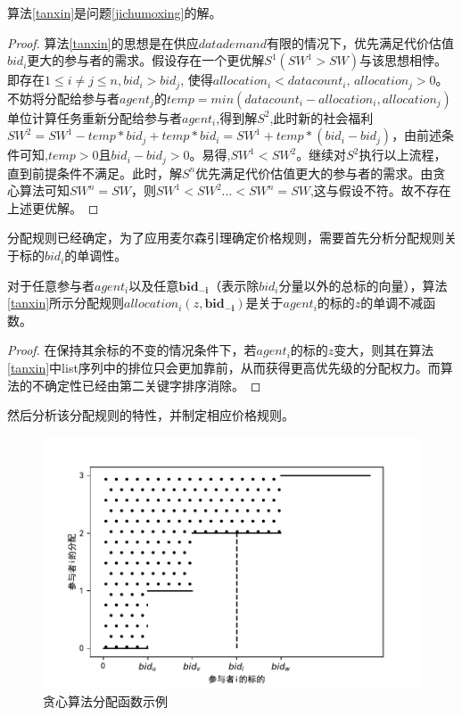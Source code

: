 \documentclass[promaster]{thesis-uestc}
\begin{document}
\begin{theorem}
算法\ref{tanxin}是问题\ref{jichumoxing}的解。
\end{theorem}

\begin{proof}
    算法\ref{tanxin}的思想是在供应$datademand$有限的情况下，优先满足代价估值$bid_i$更大的参与者的需求。假设存在一个更优解$S^1(SW^1 > SW)$与该思想相悖。即存在$1 \leq i \neq j \leq n,bid_i > bid_j$, 使得$allocation_i < datacount_i \text{, } allocation_j > 0$。不妨将分配给参与者$agent_j$的$temp = min(datacount_i - allocation_i,allocation_j)$单位计算任务重新分配给参与者$agent_i$,得到解$S^2$,此时新的社会福利$SW^2= SW^1- temp*bid_j + temp*bid_i=SW^1+temp*(bid_i-bid_j)$，由前述条件可知,$temp > 0$且$bid_i - bid_j > 0$。易得,$SW^1<SW^2 $。继续对$S^2$执行以上流程，直到前提条件不满足。此时，解$S^n$优先满足代价估值更大的参与者的需求。由贪心算法可知$SW^n = SW$，则$SW^1<SW^2...<SW^n=SW$,这与假设不符。故不存在上述更优解。
\end{proof}

分配规则已经确定，为了应用麦尔森引理确定价格规则，需要首先分析分配规则关于标的$bid_i$的单调性。

\begin{theorem}
    对于任意参与者$agent_i$以及任意$\mathbf{bid_{-i}}$（表示除$bid_i$分量以外的总标的向量），算法\ref{tanxin}所示分配规则$allocation_i(z,\mathbf{bid_{-i}})$是关于$agent_i$的标的$z$的单调不减函数。
\end{theorem}

\begin{proof}
   在保持其余标的不变的情况条件下，若$agent_i$的标的$z$变大，则其在算法\ref{tanxin}中list序列中的排位只会更加靠前，从而获得更高优先级的分配权力。而算法的不确定性已经由第二关键字排序消除。
\end{proof}

然后分析该分配规则的特性，并制定相应价格规则。

\begin{figure}[H]
    \includegraphics[width=350pt]{pic/tanxin_allocation.pdf}
    \caption{贪心算法分配函数示例}
    \label{tanxin_allocation}
\end{figure}
\end{document}
